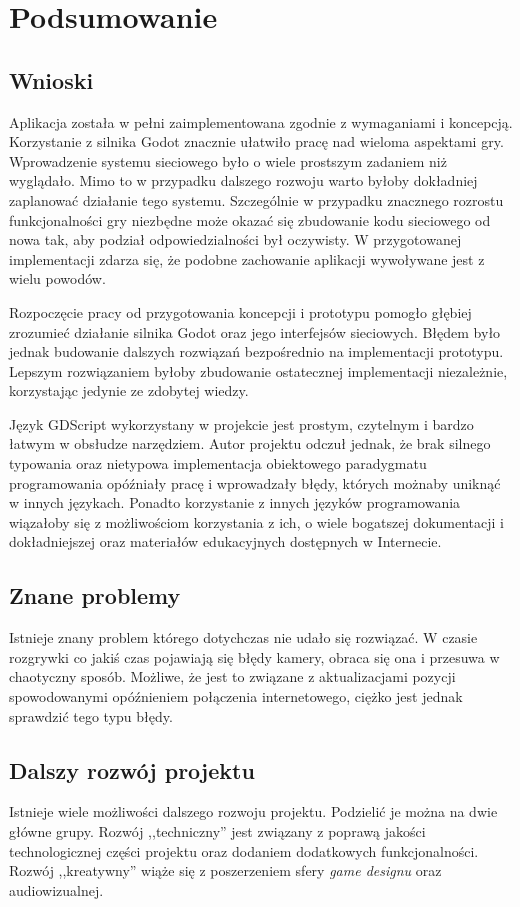 \chapter{Podsumowanie}\label{ch:conclusion}

\section{Wnioski}
Aplikacja została w pełni zaimplementowana zgodnie z wymaganiami i koncepcją. Korzystanie z silnika Godot znacznie ułatwiło pracę nad wieloma aspektami gry. Wprowadzenie systemu sieciowego było o wiele prostszym zadaniem niż wyglądało. Mimo to w przypadku dalszego rozwoju warto byłoby dokładniej zaplanować działanie tego systemu. Szczególnie w przypadku znacznego rozrostu funkcjonalności gry niezbędne może okazać się zbudowanie kodu sieciowego od nowa tak, aby podział odpowiedzialności był oczywisty. W przygotowanej implementacji zdarza się, że podobne zachowanie aplikacji wywoływane jest z wielu powodów. 

Rozpoczęcie pracy od przygotowania koncepcji i prototypu pomogło głębiej zrozumieć działanie silnika Godot oraz jego interfejsów sieciowych. Błędem było jednak budowanie dalszych rozwiązań bezpośrednio na implementacji prototypu. Lepszym rozwiązaniem byłoby zbudowanie ostatecznej implementacji niezależnie, korzystając jedynie ze zdobytej wiedzy.

Język GDScript wykorzystany w projekcie jest prostym, czytelnym i bardzo łatwym w obsłudze narzędziem. Autor projektu odczuł jednak, że brak silnego typowania oraz nietypowa implementacja obiektowego paradygmatu programowania opóźniały pracę i wprowadzały błędy, których możnaby uniknąć w innych językach. Ponadto korzystanie z innych języków programowania wiązałoby się z możliwościom korzystania z ich, o wiele bogatszej dokumentacji i dokładniejszej oraz materiałów edukacyjnych dostępnych w Internecie.

\section{Znane problemy}
Istnieje znany problem którego dotychczas nie udało się rozwiązać. W czasie rozgrywki co jakiś czas pojawiają się błędy kamery, obraca się ona i przesuwa w chaotyczny sposób. Możliwe, że jest to związane z aktualizacjami pozycji spowodowanymi opóźnieniem połączenia internetowego, ciężko jest jednak sprawdzić tego typu błędy. 

\section{Dalszy rozwój projektu}
Istnieje wiele możliwości dalszego rozwoju projektu. Podzielić je można na dwie główne grupy. Rozwój ,,techniczny'' jest związany z poprawą jakości technologicznej części projektu oraz dodaniem dodatkowych funkcjonalności. Rozwój ,,kreatywny'' wiąże się z poszerzeniem sfery \emph{game designu} oraz audiowizualnej.

